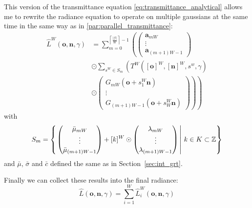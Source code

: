 \documentclass[a4paper, 11pt]{memoir}
\begin{document}
    This version of the \gls{transmittance} equation \eqref{eq:transmittance_analytical} allows me to rewrite the \gls{radiance} equation to operate on
    multiple gaussians at the same time in the same way as in \ref{par:parallel_transmittance}:
    \begin{equation}
        \begin{aligned}
            \hat{L}^W(\mathbf{o}, \mathbf{n}, \gamma) &= \sum_{m = 0}^{\left\lceil \frac{|\mathcal{G}|}{W} \right\rceil - 1} \left( \begin{pmatrix}
                \mathbf{a}_{mW}\\ \vdots \\ \mathbf{a}_{(m+1)W - 1}
            \end{pmatrix} \right.\\
            &\odot \sum_{s^W \in S_m} \left( T^W([\mathbf{o}]^W, [\mathbf{n}]^W, s^w, \gamma)\right.\\
            &\odot \left.\left.\begin{pmatrix}
                G_{mW}(\mathbf{o} + s^W_1\mathbf{n})\\ \vdots\\ G_{(m+1)W - 1}(\mathbf{o} + s^W_W\mathbf{n})
            \end{pmatrix}\right)\right)
        \end{aligned}
        \label{eq:radiance_parallel_gaussians}
    \end{equation}
    with
    \[ S_m = \left\{\left. \begin{pmatrix}
        \bar{\mu}_{mW}\\ \vdots\\ \bar{\mu}_{(m+1)W - 1}
    \end{pmatrix} + [k]^W \odot \begin{pmatrix}
        \lambda_{mW}\\ \vdots\\ \lambda_{(m+1)W - 1}
    \end{pmatrix} \,\right|\, k \in K \subset \mathbb{Z} \right\} \]
    and $\bar{\mu}$, $\bar{\sigma}$ and $\bar{c}$ defined the same as in Section~\ref{sec:int_grt}.

    Finally we can collect these results into the final \gls{radiance}:
    \begin{equation}
        \hat{L}(\mathbf{o}, \mathbf{n}, \gamma) = \sum_{i = 1}^W \hat{L}^W_i(\mathbf{o}, \mathbf{n}, \gamma)
        \label{eq:radiance_parallel_final}
    \end{equation}
\end{document}
